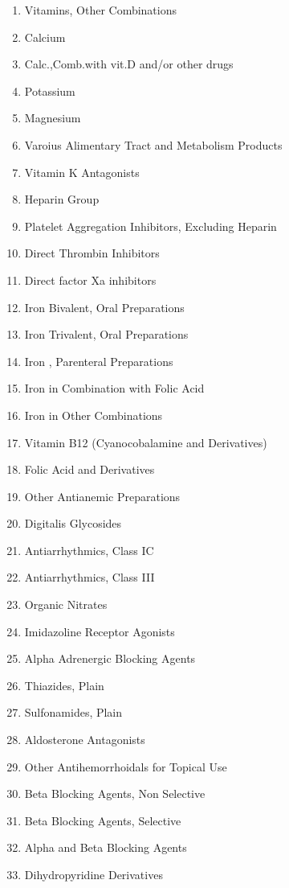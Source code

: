 \documentclass[a4paper,12pt]{article}
\begin{document}
\begin{appendices}
\begin{enumerate}
   			\item Vitamins, Other Combinations
   			\item Calcium
   			\item Calc.,Comb.with vit.D and/or other drugs
   			\item Potassium
   			\item Magnesium
   			\item Varoius Alimentary Tract and Metabolism Products
   			\item Vitamin K Antagonists
   			\item Heparin Group
   			\item Platelet Aggregation Inhibitors, Excluding Heparin
   			\item Direct Thrombin Inhibitors
   			\item Direct factor Xa inhibitors
   			\item Iron Bivalent, Oral Preparations
   			\item Iron Trivalent, Oral Preparations
   			\item Iron , Parenteral Preparations
   			\item Iron in Combination with Folic Acid
   			\item Iron in Other Combinations
   			\item Vitamin B12 (Cyanocobalamine and Derivatives)
   			\item Folic Acid and Derivatives
   			\item Other Antianemic Preparations
   			\item Digitalis Glycosides
   			\item Antiarrhythmics, Class IC
   			\item Antiarrhythmics, Class III
   			\item Organic Nitrates
   			\item Imidazoline Receptor Agonists
   			\item Alpha Adrenergic Blocking Agents
   			\item Thiazides, Plain
   			\item Sulfonamides, Plain
   			\item Aldosterone Antagonists
   			\item Other Antihemorrhoidals for Topical Use
   			\item Beta Blocking Agents, Non Selective
   			\item Beta Blocking Agents, Selective
   			\item Alpha and Beta Blocking Agents
   			\item Dihydropyridine Derivatives

\end{enumerate}
\end{appendices}
\end{document}
